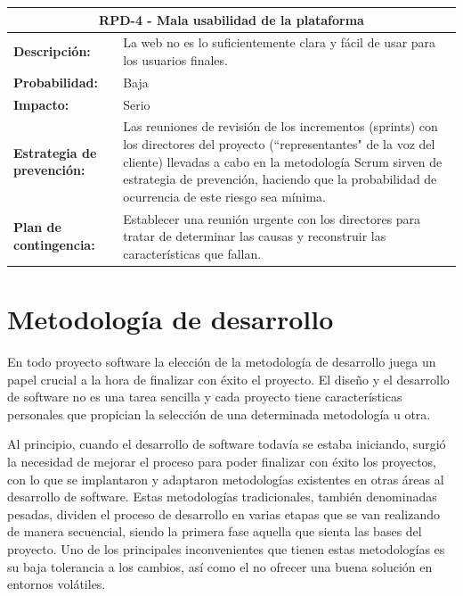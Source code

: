 \begin{table}[H]
	\begin{tabular}{| p{4cm}| p{10cm} |}
		\hline
		\multicolumn{2}{|c|}{\textbf{RPD-4} - Mala usabilidad de la plataforma} \\ \hline
		\textbf{Descripción:} & La web no es lo suficientemente clara y fácil de usar para los usuarios finales. \\ \hline
		\textbf{Probabilidad:} & Baja \\ \hline
		\textbf{Impacto:} & Serio \\ \hline
		\textbf{Estrategia de prevención:} & Las reuniones de revisión de los incrementos (sprints) con los directores del proyecto (``representantes" de la voz del cliente) llevadas a cabo en la metodología Scrum sirven de estrategia de prevención, haciendo que la probabilidad de ocurrencia de este riesgo sea mínima. \\ \hline
		\textbf{Plan de contingencia:} & Establecer una reunión urgente con los directores para tratar de determinar las causas y reconstruir las características que fallan. \\ \hline
	\end{tabular}
\end{table}

\section{Metodología de desarrollo} \label{metodologia}
En todo proyecto software la elección de la metodología de desarrollo juega un papel crucial a la hora de finalizar con éxito el proyecto. El diseño y el desarrollo de software no es una tarea sencilla y cada proyecto tiene características personales que propician la selección de una determinada metodología u otra.

Al principio, cuando el desarrollo de software todavía se estaba iniciando, surgió la necesidad de mejorar el proceso para poder finalizar con éxito los proyectos, con lo que se implantaron y adaptaron metodologías existentes en otras áreas al desarrollo de software. Estas metodologías tradicionales, también denominadas pesadas, dividen el proceso de desarrollo en varias etapas que se van realizando de manera secuencial, siendo la primera fase aquella que sienta las bases del proyecto. Uno de los principales inconvenientes que tienen estas metodologías es su baja tolerancia a los cambios, así como el no ofrecer una buena solución en entornos volátiles.

